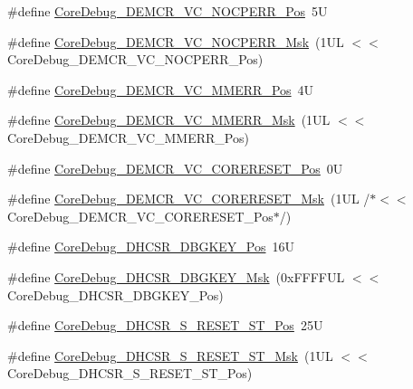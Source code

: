 \begin{DoxyCompactItemize}
\item 
\#define \mbox{\hyperlink{group___c_m_s_i_s___core_debug_gac9d13eb2add61f610d5ced1f7ad2adf8}{Core\+Debug\+\_\+\+D\+E\+M\+C\+R\+\_\+\+V\+C\+\_\+\+N\+O\+C\+P\+E\+R\+R\+\_\+\+Pos}}~5U
\item 
\#define \mbox{\hyperlink{group___c_m_s_i_s___core_debug_ga03ee58b1b02fdbf21612809034562f1c}{Core\+Debug\+\_\+\+D\+E\+M\+C\+R\+\_\+\+V\+C\+\_\+\+N\+O\+C\+P\+E\+R\+R\+\_\+\+Msk}}~(1\+U\+L $<$$<$ Core\+Debug\+\_\+\+D\+E\+M\+C\+R\+\_\+\+V\+C\+\_\+\+N\+O\+C\+P\+E\+R\+R\+\_\+\+Pos)
\item 
\#define \mbox{\hyperlink{group___c_m_s_i_s___core_debug_ga444454f7c7748e76cd76c3809c887c41}{Core\+Debug\+\_\+\+D\+E\+M\+C\+R\+\_\+\+V\+C\+\_\+\+M\+M\+E\+R\+R\+\_\+\+Pos}}~4U
\item 
\#define \mbox{\hyperlink{group___c_m_s_i_s___core_debug_gad420a9b60620584faaca6289e83d3a87}{Core\+Debug\+\_\+\+D\+E\+M\+C\+R\+\_\+\+V\+C\+\_\+\+M\+M\+E\+R\+R\+\_\+\+Msk}}~(1\+U\+L $<$$<$ Core\+Debug\+\_\+\+D\+E\+M\+C\+R\+\_\+\+V\+C\+\_\+\+M\+M\+E\+R\+R\+\_\+\+Pos)
\item 
\#define \mbox{\hyperlink{group___c_m_s_i_s___core_debug_ga9fcf09666f7063a7303117aa32a85d5a}{Core\+Debug\+\_\+\+D\+E\+M\+C\+R\+\_\+\+V\+C\+\_\+\+C\+O\+R\+E\+R\+E\+S\+E\+T\+\_\+\+Pos}}~0U
\item 
\#define \mbox{\hyperlink{group___c_m_s_i_s___core_debug_ga906476e53c1e1487c30f3a1181df9e30}{Core\+Debug\+\_\+\+D\+E\+M\+C\+R\+\_\+\+V\+C\+\_\+\+C\+O\+R\+E\+R\+E\+S\+E\+T\+\_\+\+Msk}}~(1\+U\+L /$\ast$$<$$<$ Core\+Debug\+\_\+\+D\+E\+M\+C\+R\+\_\+\+V\+C\+\_\+\+C\+O\+R\+E\+R\+E\+S\+E\+T\+\_\+\+Pos$\ast$/)
\item 
\#define \mbox{\hyperlink{group___c_m_s_i_s___core_debug_gac91280edd0ce932665cf75a23d11d842}{Core\+Debug\+\_\+\+D\+H\+C\+S\+R\+\_\+\+D\+B\+G\+K\+E\+Y\+\_\+\+Pos}}~16U
\item 
\#define \mbox{\hyperlink{group___c_m_s_i_s___core_debug_ga1ce997cee15edaafe4aed77751816ffc}{Core\+Debug\+\_\+\+D\+H\+C\+S\+R\+\_\+\+D\+B\+G\+K\+E\+Y\+\_\+\+Msk}}~(0x\+F\+F\+F\+F\+U\+L $<$$<$ Core\+Debug\+\_\+\+D\+H\+C\+S\+R\+\_\+\+D\+B\+G\+K\+E\+Y\+\_\+\+Pos)
\item 
\#define \mbox{\hyperlink{group___c_m_s_i_s___core_debug_ga6f934c5427ea057394268e541fa97753}{Core\+Debug\+\_\+\+D\+H\+C\+S\+R\+\_\+\+S\+\_\+\+R\+E\+S\+E\+T\+\_\+\+S\+T\+\_\+\+Pos}}~25U
\item 
\#define \mbox{\hyperlink{group___c_m_s_i_s___core_debug_gac474394bcceb31a8e09566c90b3f8922}{Core\+Debug\+\_\+\+D\+H\+C\+S\+R\+\_\+\+S\+\_\+\+R\+E\+S\+E\+T\+\_\+\+S\+T\+\_\+\+Msk}}~(1\+U\+L $<$$<$ Core\+Debug\+\_\+\+D\+H\+C\+S\+R\+\_\+\+S\+\_\+\+R\+E\+S\+E\+T\+\_\+\+S\+T\+\_\+\+Pos)

\end{DoxyCompactItemize}

